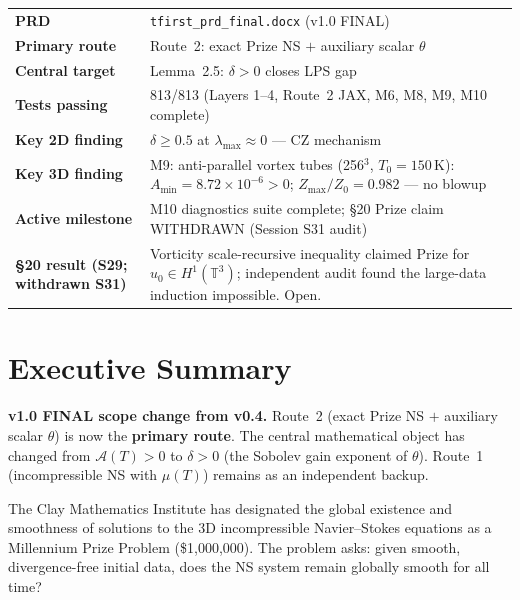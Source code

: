 \documentclass[11pt, a4paper]{article}
\theoremstyle{definition}
\theoremstyle{remark}
\newenvironment{scopenote}{%
  \begin{tcolorbox}[colback=tforange!6, colframe=tforange!60!black,
    title=\textbf{v1.0 Scope Change}, fonttitle=\small\bfseries,
    breakable, left=4pt, right=4pt, top=4pt, bottom=4pt]
}{%
  \end{tcolorbox}
}
\newcommand{\Afield}{\mathcal{A}}
\newcommand{\thet}{\theta}
\newcommand{\delt}{\delta}
\begin{document}
\begin{titlepage}
  \vfill
  \begin{tabular}{ll}
    \toprule
    \textbf{PRD} & \texttt{tfirst\_prd\_final.docx} (v1.0 FINAL) \\
    \textbf{Primary route} & Route~2: exact Prize NS $+$ auxiliary scalar $\thet$ \\
    \textbf{Central target} & Lemma~2.5: $\delt > 0$ closes LPS gap \\
    \textbf{Tests passing} & 813/813 (Layers 1--4, Route~2 JAX, M6, M8, M9, M10 complete) \\
    \textbf{Key 2D finding} & $\delt \geq 0.5$ at $\lambda_{\max} \approx 0$ --- CZ mechanism \\
    \textbf{Key 3D finding} & M9: anti-parallel vortex tubes (256$^3$, $T_0=150$\,K): $A_{\min}=8.72\times10^{-6}>0$; $Z_{\max}/Z_0=0.982$ --- no blowup \\
    \textbf{Active milestone} & M10 diagnostics suite complete; \S20 Prize claim WITHDRAWN (Session S31 audit) \\
    \textbf{\S20 result (S29; withdrawn S31)} & Vorticity scale-recursive inequality claimed Prize for $u_0\in H^1(\mathbb{T}^3)$; independent audit found the large-data induction impossible. Open. \\
    \bottomrule
  \end{tabular}
\end{titlepage}

\tableofcontents
\clearpage

\section{Executive Summary}

\begin{scopenote}
\textbf{v1.0 FINAL scope change from v0.4.}
Route~2 (exact Prize NS $+$ auxiliary scalar $\thet$) is now the \textbf{primary route}.
The central mathematical object has changed from $\Afield(T) > 0$ to
$\delt > 0$ (the Sobolev gain exponent of $\thet$).
Route~1 (incompressible NS with $\mu(T)$) remains as an independent backup.
\end{scopenote}

The Clay Mathematics Institute has designated the global existence and smoothness
of solutions to the 3D incompressible Navier--Stokes equations as a Millennium Prize
Problem (\$1,000,000). The problem asks: given smooth, divergence-free initial data,
does the NS system remain globally smooth for all time?
\end{document}
